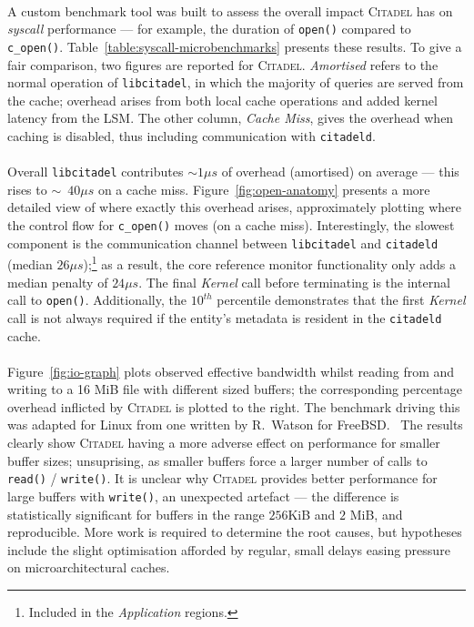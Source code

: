 \paragraph{} A custom benchmark tool was built to assess the overall impact \textsc{Citadel} has on \textit{syscall} performance --- for example, the duration of \texttt{open()} compared to \texttt{c\_open()}. Table~\ref{table:syscall-microbenchmarks} presents these results. To give a fair comparison, two figures are reported for \textsc{Citadel}. \textit{Amortised} refers to the normal operation of \texttt{libcitadel}, in which the majority of queries are served from the cache; overhead arises from both local cache operations and added kernel latency from the LSM. The other column, \textit{Cache Miss}, gives the overhead when caching is disabled, thus including communication with \texttt{citadeld}.

\paragraph{} Overall \texttt{libcitadel} contributes $\sim{}1 \mu s$ of overhead (amortised) on average --- this rises to $\sim$~$40 \mu s$ on a cache miss. Figure~\ref{fig:open-anatomy} presents a more detailed view of where exactly this overhead arises, approximately plotting where the control flow for \texttt{c\_open()} moves (on a cache miss). Interestingly, the slowest component is the communication channel between \texttt{libcitadel} and \texttt{citadeld} (median $26\mu s$);\footnote{Included in the \textit{Application} regions.} as a result, the core reference monitor functionality only adds a median penalty of $24\mu s$. The final \textit{Kernel} call before terminating is the internal call to \texttt{open()}. Additionally, the $10^{th}$ percentile demonstrates that the first \textit{Kernel} call is not always required if the entity's metadata is resident in the \texttt{citadeld} cache.

\paragraph{} Figure~\ref{fig:io-graph} plots observed effective bandwidth whilst reading from and writing to a 16 MiB file with different sized buffers; the corresponding percentage overhead inflicted by \textsc{Citadel} is plotted to the right. The benchmark driving this was adapted for Linux from one written by R.~Watson for FreeBSD.~\cite{l41-benchmark} The results clearly show \textsc{Citadel} having a more adverse effect on performance for smaller buffer sizes; unsuprising, as smaller buffers force a larger number of calls to \texttt{read()} / \texttt{write()}. It is unclear why \textsc{Citadel} provides better performance for large buffers with \texttt{write()}, an unexpected artefact --- the difference is statistically significant for buffers in the range $256$KiB and $2$ MiB, and reproducible. More work is required to determine the root causes, but hypotheses include the slight optimisation afforded by regular, small delays easing pressure on microarchitectural caches.



